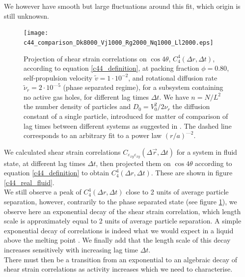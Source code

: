 \documentclass[class=report, float=false, crop=false]{standalone}
\begin{document}
We however have smooth but large fluctuations around this fit, which origin is still unknowsn.\\

\begin{figure}[H]
\centering
\texttt{[image: c44\_comparison\_Dk8000\_Vj1000\_Rg2000\_Nq1000\_Ll2000.eps]}
\caption{Projection of shear strain correlations on $\cos4\theta$, $C_4^4(\Delta r, \Delta t)$, according to equation \ref{c44_definition}, at packing fraction $\phi = 0.80$, self-propulsion velocity $\tilde{v} = 1\cdot10^{-2}$, and rotational diffusion rate $\tilde{\nu}_r = 2\cdot10^{—5}$ (phase separated regime), for a subsystem containing no active gas holes, for different lag times $\Delta t$. We have $n = N/L^2$ the number density of particles and $D_0 = V_0^2/2\nu_r$ the diffusion constant of a single particle, introduced for matter of comparison of lag times between different systems as suggested in \cite{illing2016strain}. The dashed line corresponds to an arbitrary fit to a power law $(r/a)^{—2}$.}
\label{c44_real}
\end{figure}


We calculated shear strain correlations $C_{\varepsilon_{xy}\varepsilon_{xy}}(\Delta \vec{r}, \Delta t)$ for a system in fluid state, at different lag times $\Delta t$, then projected them on $\cos4\theta$ according to equation \ref{c44_definition} to obtain $C_4^4(\Delta r, \Delta t)$. These are shown in figure \ref{c44_real_fluid}.\\

We still observe a peak of $C_4^4(\Delta r, \Delta t)$ close to 2 units of average particle separation, however, contrarily to the phase separated state (see figure \ref{c44_real}), we observe here an exponential decay of the shear strain correlation, which length scale is approximately equal to 2 units of average particle separation. A simple exponential decay of correlations is indeed what we would expect in a liquid above the melting point \cite{debenedetti2001supercooled}. We finally add that the length scale of this decay increases sensitively with increasing lag time $\Delta t$.\\

There must then be a transition from an exponential to an algebraic decay of shear strain correlations as activity increases which we need to characterise.
\end{document}

